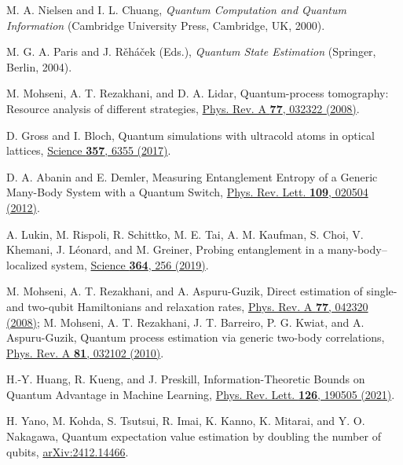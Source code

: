 \documentclass[aps,pra,twocolumn,floatfix,groupedaddress,superscriptaddress,nofootinbib,notitlepage]{revtex4-2}
\begin{document}
\begin{thebibliography}{100}

 M. A. Nielsen and I. L. Chuang, \emph{Quantum Computation and Quantum Information} (Cambridge University Press, Cambridge, UK, 2000). 

 M. G. A. Paris and J. R\v{e}h\'{a}\v{c}ek (Eds.), \emph{Quantum State Estimation} (Springer, Berlin, 2004).

 M. Mohseni, A. T. Rezakhani, and D. A. Lidar, Quantum-process tomography: Resource analysis of different strategies, \href{https://doi.org/10.1103/PhysRevA.77.032322}{Phys. Rev. A \textbf{77}, 032322 (2008)}.

 D. Gross and I. Bloch, Quantum simulations with ultracold atoms in optical lattices, \href{https://doi.org/10.1126/science.aal3837}{Science \textbf{357}, 6355 (2017)}.

 D. A. Abanin and E. Demler, Measuring Entanglement Entropy of a Generic Many-Body System with a Quantum Switch, \href{https://doi.org/10.1103/PhysRevLett.109.020504}{Phys. Rev. Lett. \textbf{109}, 020504 (2012)}.

 A. Lukin, M. Rispoli, R. Schittko, M. E. Tai, A. M. Kaufman, S. Choi, V. Khemani, J. L\'{e}onard, and M. Greiner, Probing entanglement in a many-body–localized system, \href{https://doi.org/10.1126/science.aau0818}{Science \textbf{364}, 256 (2019)}.

 M. Mohseni, A. T. Rezakhani, and A. Aspuru-Guzik, Direct estimation of single- and two-qubit Hamiltonians and relaxation rates, \href{https://doi.org/10.1103/PhysRevA.77.042320}{Phys. Rev. A \textbf{77}, 042320 (2008)}; M. Mohseni, A. T. Rezakhani, J. T. Barreiro, P. G. Kwiat, and A. Aspuru-Guzik, Quantum process estimation via generic two-body correlations, \href{https://doi.org/10.1103/PhysRevA.81.032102}{Phys. Rev. A \textbf{81}, 032102 (2010)}.

 H.-Y. Huang, R. Kueng, and J. Preskill, Information-Theoretic Bounds on Quantum Advantage in Machine Learning,
 \href{https://doi.org/10.1103/PhysRevLett.126.190505}{Phys. Rev. Lett. \textbf{126}, 190505 (2021)}.
 
H. Yano, M. Kohda, S. Tsutsui, R. Imai, K. Kanno, K. Mitarai, and Y. O. Nakagawa, Quantum expectation value estimation by doubling the number of qubits, \href{https://arxiv.org/abs/2412.14466}{arXiv:2412.14466}.


\end{thebibliography}
\end{document}
